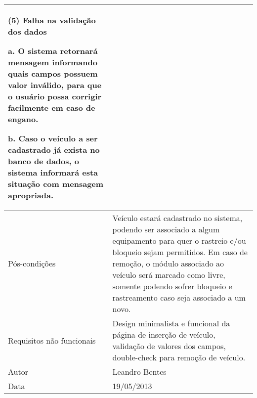 \begin{flushleft}
\begin{supertabular}{|m{5.5680003cm}|m{9.325cm}|}
(5) Falha na validação dos dados

a. O sistema retornará mensagem informando quais campos possuem valor inválido, para que o usuário possa corrigir facilmente em caso de engano.

b. Caso o veículo a ser cadastrado já exista no banco de dados, o sistema informará esta situação com mensagem apropriada. \\\hline
Pós-condições &
Veículo estará cadastrado no sistema, podendo ser associado a algum equipamento para quer o rastreio e/ou bloqueio sejam permitidos. Em caso de remoção, o módulo associado ao veículo será marcado como livre, somente podendo sofrer bloqueio e rastreamento caso seja associado a um novo.\\\hline
Requisitos não funcionais &
Design minimalista e funcional da página de inserção de veículo, validação de valores dos campos, double-check para remoção de veículo.\\\hline
Autor &
Leandro Bentes\\\hline
Data &
19/05/2013\\\hline
\end{supertabular}
\end{flushleft}

